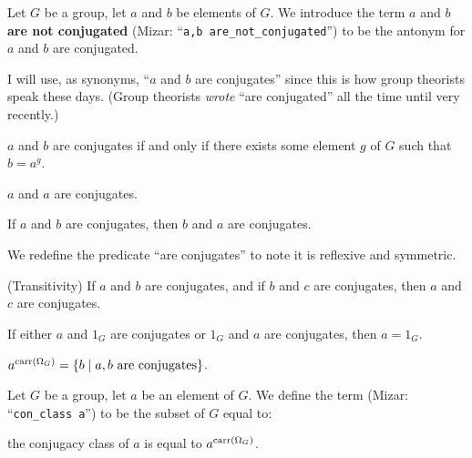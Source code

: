 \documentclass{article}
\begin{document}
\begin{notation}
Let $G$ be a group, let $a$ and $b$ be elements of $G$.
We introduce the term $a$ and $b$ \textbf{are not conjugated} (Mizar:
``\verb#a,b are_not_conjugated#'') to be the
antonym for $a$ and $b$ are conjugated.
\end{notation}

\begin{remark}
I will use, as synonyms, ``$a$ and $b$ are conjugates'' since this is
how group theorists speak these days. (Group theorists \emph{wrote}
``are conjugated'' all the time until very recently.)
\end{remark}

\begin{thm}
\item\label{group3:74} $a$ and $b$ are conjugates if and only if there
  exists some element $g$ of $G$ such that $b=a^{g}$.
\item\label{group3:75} $a$ and $a$ are conjugates.
\item\label{group3:76} If $a$ and $b$ are conjugates, then $b$ and $a$
  are conjugates.
\end{thm}

\begin{definition}
We redefine the predicate ``are conjugates'' to note it is reflexive and symmetric.
\end{definition}

\begin{thm}
\item\label{group3:77} (Transitivity) If $a$ and $b$ are conjugates, and
  if $b$ and $c$ are conjugates, then $a$ and $c$ are conjugates.
\item\label{group3:78} If either $a$ and $1_{G}$ are conjugates or
  $1_{G}$ and $a$ are conjugates, then $a=1_{G}$.
\item\label{group3:79} $a^{\operatorname{carr}(\Omega_{G})}=\{b\mid a,b\mbox{ are conjugates}\}$.
\end{thm}

\begin{definition}
Let $G$ be a group, let $a$ be an element of $G$.
We define the term  (Mizar:
``\verb#con_class a#'') to be the subset of
$G$ equal to:
\begin{defn}
\item the conjugacy class of $a$ is equal to $a^{\operatorname{carr}(\Omega_{G})}$.
\end{defn}
\end{definition}
\end{document}
